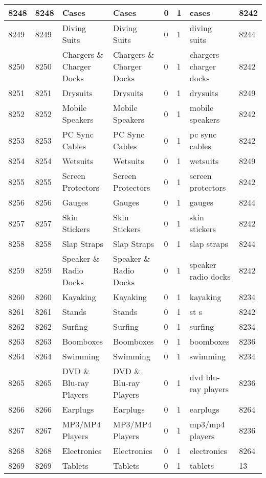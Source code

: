 \begin{longtable}{|l|l|l|l|l|l|l|l|}
8248 & 8248 & Cases & Cases & 0 & 1 & cases & 8242 \\ \hline 
8249 & 8249 & Diving Suits & Diving Suits & 0 & 1 & diving suits & 8244 \\ \hline 
8250 & 8250 & Chargers \& Charger Docks & Chargers \& Charger Docks & 0 & 1 & chargers charger docks & 8242 \\ \hline 
8251 & 8251 & Drysuits & Drysuits & 0 & 1 & drysuits & 8249 \\ \hline 
8252 & 8252 & Mobile Speakers & Mobile Speakers & 0 & 1 & mobile speakers & 8242 \\ \hline 
8253 & 8253 & PC Sync Cables & PC Sync Cables & 0 & 1 & pc sync cables & 8242 \\ \hline 
8254 & 8254 & Wetsuits & Wetsuits & 0 & 1 & wetsuits & 8249 \\ \hline 
8255 & 8255 & Screen Protectors & Screen Protectors & 0 & 1 & screen protectors & 8242 \\ \hline 
8256 & 8256 & Gauges & Gauges & 0 & 1 & gauges & 8244 \\ \hline 
8257 & 8257 & Skin Stickers & Skin Stickers & 0 & 1 & skin stickers & 8242 \\ \hline 
8258 & 8258 & Slap Straps & Slap Straps & 0 & 1 & slap straps & 8244 \\ \hline 
8259 & 8259 & Speaker \& Radio Docks & Speaker \& Radio Docks & 0 & 1 & speaker radio docks & 8242 \\ \hline 
8260 & 8260 & Kayaking & Kayaking & 0 & 1 & kayaking & 8234 \\ \hline 
8261 & 8261 & Stands & Stands & 0 & 1 & st s & 8242 \\ \hline 
8262 & 8262 & Surfing & Surfing & 0 & 1 & surfing & 8234 \\ \hline 
8263 & 8263 & Boomboxes & Boomboxes & 0 & 1 & boomboxes & 8236 \\ \hline 
8264 & 8264 & Swimming & Swimming & 0 & 1 & swimming & 8234 \\ \hline 
8265 & 8265 & DVD \& Blu-ray Players & DVD \& Blu-ray Players & 0 & 1 & dvd blu-ray players & 8236 \\ \hline 
8266 & 8266 & Earplugs & Earplugs & 0 & 1 & earplugs & 8264 \\ \hline 
8267 & 8267 & MP3/MP4 Players & MP3/MP4 Players & 0 & 1 & mp3/mp4 players & 8236 \\ \hline 
8268 & 8268 & Electronics & Electronics & 0 & 1 & electronics & 8264 \\ \hline 
8269 & 8269 & Tablets & Tablets & 0 & 1 & tablets & 13 \\ \hline 

\end{longtable}
